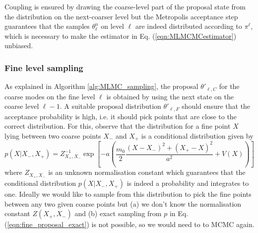 \documentclass[11pt]{article}
\begin{document}
Coupling is ensured by drawing the coarse-level part of the proposal state from the distribution on the next-coarser level but the Metropolis acceptance step guarantees that the samples $\theta_\ell^n$ on level $\ell$ are indeed distributed according to $\pi^\ell$, which is necessary to make the estimator in Eq. (\ref{eqn:MLMCMCestimator}) unbiased.
\subsubsection{Fine level sampling}\label{sec:fine_draw}
As explained in Algorithm \ref{alg:MLMC_sampling}, the proposal $\theta'_{\ell,C}$ for the coarse modes on the fine level $\ell$ is obtained by using the next state on the coarse level $\ell-1$. A suitable proposal distribution $\theta'_{\ell,F}$ should ensure that the acceptance probability is high, i.e. it should pick points that are close to the correct distribution. For this, observe that the distribution for a fine point $X$ lying between two coarse points $X_-$ and $X_+$ is a conditional distribution given by
\begin{equation}
  p(X|X_-,X_+) = Z_{X_+,X_-}^{-1} \exp\left[
  - a \left(\frac{m_0}{2}\frac{(X-X_-)^2+(X_+-X)^2}{a^2}+V(X)\right)
  \right]\label{eqn:fine_proposal_exact}
\end{equation}
where $Z_{X_+,X_-}$ is an unknown normalisation constant which guarantees that the conditional distribution $p(X|X_-,X_+)$ is indeed a probability and integrates to one. Ideally we would like to sample from this distribution to pick the fine points between any two given coarse points but (a) we don't know the normalisation constant $Z(X_+,X_-)$ and (b) exact sampling from $p$ in Eq. (\ref{eqn:fine_proposal_exact}) is not possible, so we would need to to MCMC again.
\end{document}
